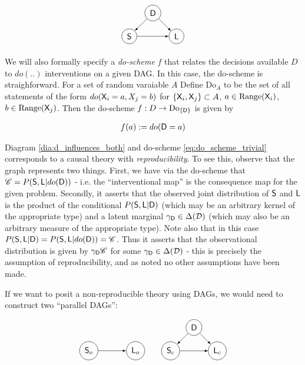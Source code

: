 \begin{align}
\begin{tikzpicture}[-latex]
\path (0,0) node[draw,circle] (D) {$\RV{D}$}
++(-1,-1) node[draw,circle] (S) {$\RV{S}$}
++(2,0) node[draw,circle] (L) {$\RV{L}$};
\draw (D) -- (S);
\draw (S) -- (L);
\draw (D) -- (L);
\end{tikzpicture}\label{dia:d_influences_both}
\end{align}

We will also formally specify a \emph{do-scheme} $f$ that relates the decisions available $D$ to $do(..)$ interventions on a given DAG. In this case, the do-scheme is straighforward. For a set of random varaiable $A$ Define $\mathrm{Do}_{A}$ to be the set of all statements of the form $do(\mathsf{X}_i=a,X_j=b)$ for $\{\mathsf{X}_i,\mathsf{X}_j\}\subset A$, $a\in \mathrm{Range}(\mathsf{X}_i)$, $b\in \mathrm{Range}(\mathsf{X}_j)$. Then the do-scheme $f:D\to \mathrm{Do}_{\{\mathsf{D}\}}$ is given by

\begin{align}
	f(a) := do(\mathsf{D}=a) \label{eq:do_scheme_trivial}
\end{align}

Diagram \ref{dia:d_influences_both} and do-scheme \ref{eq:do_scheme_trivial} corresponds to a causal theory with \emph{reproducibility}. To see this, observe that the graph represents two things. First, we have via the do-scheme that $\mathscr{C} = P(\mathsf{S},\mathsf{L}|do(\mathsf{D}))$ - i.e. the ``interventional map'' is the consequence map for the given problem. Secondly, it asserts that the observed joint distribution of $\mathsf{S}$ and $\mathsf{L}$ is the product of the conditional $P(\mathsf{S},\mathsf{L}|\mathsf{D})$ (which may be an arbitrary kernel of the appropriate type) and a latent marginal $\gamma_{\mathsf{D}}\in \Delta(\mathcal{D})$ (which may also be an arbitrary measure of the appropriate type). Note also that in this case $P(\mathsf{S},\mathsf{L}|\mathsf{D})=P(\mathsf{S},\mathsf{L}|do(\mathsf{D}))=\mathscr{C}$. Thus it asserts that the observational distribution is given by $\gamma_{\mathsf{D}}\mathscr{C}$ for some $\gamma_{\mathsf{D}}\in \Delta(\mathcal{D})$ - this is precisely the assumption of reproducibility, and as noted no other assumptions have been made.

If we want to posit a non-reproducible theory using DAGs, we would need to construct two ``parallel DAGs'':

\begin{align}
\begin{tikzpicture}[-latex]
\path (0,0) node[draw,circle] (S) {$\RV{S}_o$}
++(2,0) node[draw,circle] (L) {$\RV{L}_o$};
\draw (S) -- (L);
\end{tikzpicture} \qquad
\begin{tikzpicture}[-latex]
\path (0,0) node[draw,circle] (D) {$\RV{D}$}
++(-1,-1) node[draw,circle] (S) {$\RV{S}_c$}
++(2,0) node[draw,circle] (L) {$\RV{L}_c$};
\draw (D) -- (S);
\draw (S) -- (L);
\draw (D) -- (L);
\end{tikzpicture}\label{dia:d_influences_both_nonreproducible}
\end{align}

